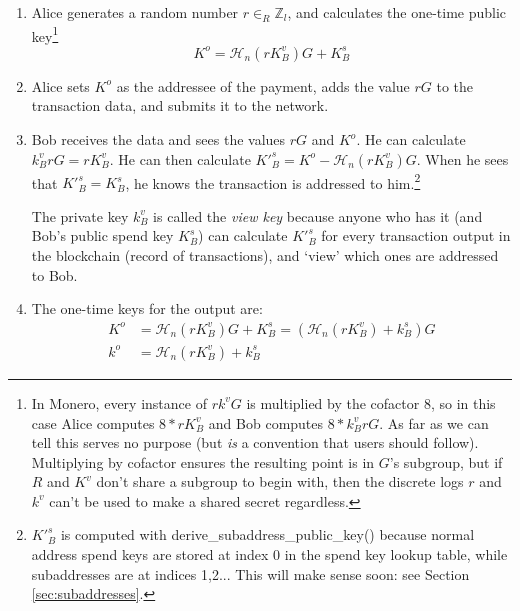 \begin{enumerate}
	\item Alice generates a random number $r \in_R \mathbb{Z}_l$, and calculates the one-time public key\footnote{In Monero, every instance of $r k^v G$ is multiplied by the cofactor 8, so in this case Alice computes $8*r K^v_B$ and Bob computes $8*k^v_B r G$. As far as we can tell this serves no purpose (but {\em is} a convention that users should follow). Multiplying by cofactor ensures the resulting point is in $G$'s subgroup, but if $R$ and $K^v$ don't share a subgroup to begin with, then the discrete logs $r$ and $k^v$ can't be used to make a shared secret regardless.}\vspace{.2cm}
	\[ K^o  = \mathcal{H}_n(r K_B^v)G + K_B^s \]

	\item Alice sets $K^o$ as the addressee of the payment, adds the value $r G$ to the transaction data, and submits it to the network.

	\item 	Bob receives the data and sees the values $r G$ and $K^o$. He can calculate $k_B^v r G = r K_B^v$. He can then calculate $K'^s_B = K^o - \mathcal{H}_n(r K_B^v)G$. When he sees that $K'^s_B = K_B^s$, he knows the transaction is addressed to him.\footnote{$K'^s_B $ is computed with derive\_subaddress\_public\_key() because normal address spend keys are stored at index 0 in the spend key lookup table, while subaddresses are at indices 1,2... This will make sense soon: see Section \ref{sec:subaddresses}.}

	The private key $k_B^v$ is called the {\em view key} because anyone who has it (and Bob’s public spend key $K_B^s$) can calculate $K'^s_B$ for every transaction output in the blockchain (record of transactions), and ‘view’ which ones are addressed to Bob.

	\item The one-time keys for the output are:\vspace{.2cm}
	\begin{align*}
		K^o &= \mathcal{H}_n(r K_B^v)G + K_B^s = (\mathcal{H}_n(r K_B^v) + k_B^s)G  \\
		k^o &= \mathcal{H}_n(r K_B^v) + k_B^s
	\end{align*}
\end{enumerate}

